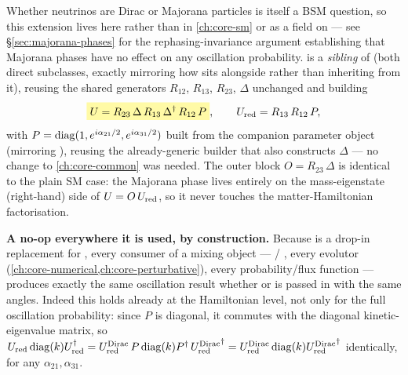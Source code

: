 \begin{theorybox}
Whether neutrinos are Dirac or Majorana particles is itself a BSM question,
so this extension lives here rather than in \cref{ch:core-sm} or as a field
on  --- see \S\ref{sec:majorana-phases} for the
rephasing-invariance argument establishing that Majorana phases have no
effect on any oscillation probability.  is a
\emph{sibling} of  (both direct 
subclasses, exactly mirroring how  sits alongside
 rather than inheriting from it), reusing the shared
generators $R_{12}$, $R_{13}$, $R_{23}$, $\Delta$ unchanged and building
\begin{equation}
  \keyresult{U = R_{23}\,\Delta\,R_{13}\,\Delta^\dagger\,R_{12}\,P},
  \qquad
  U_{\rm red} = R_{13}\,R_{12}\,P,
\end{equation}
with $P=\operatorname{diag}(1,e^{i\alpha_{21}/2},e^{i\alpha_{31}/2})$ built from the
companion  parameter object (mirroring
), reusing the already-generic
 builder that also constructs $\Delta$ --- no
change to \cref{ch:core-common} was needed. The outer block
$O=R_{23}\,\Delta$ is identical to the plain SM case: the Majorana phase
lives entirely on the mass-eigenstate (right-hand) side of
$U=O\,U_{\rm red}$, so it never touches the matter-Hamiltonian
factorisation.

\textbf{A no-op everywhere it is used, by construction.} Because
 is a drop-in replacement for ,
every consumer of a mixing object --- /%
, every evolutor
(\cref{ch:core-numerical,ch:core-perturbative}), every probability/flux
function --- produces exactly the same oscillation result whether
 or  is passed in with the same
angles. Indeed this holds already at the Hamiltonian level, not only for
the full oscillation probability: since $P$ is diagonal, it commutes with
the diagonal kinetic-eigenvalue matrix, so
$U_{\rm red}\operatorname{diag}(k)U_{\rm red}^\dagger
=U_{\rm red}^{\rm Dirac}\,P\operatorname{diag}(k)P^\dagger\,{U_{\rm red}^{\rm Dirac}}^\dagger
=U_{\rm red}^{\rm Dirac}\operatorname{diag}(k){U_{\rm red}^{\rm Dirac}}^\dagger$
identically, for any $\alpha_{21},\alpha_{31}$.


\end{theorybox}
